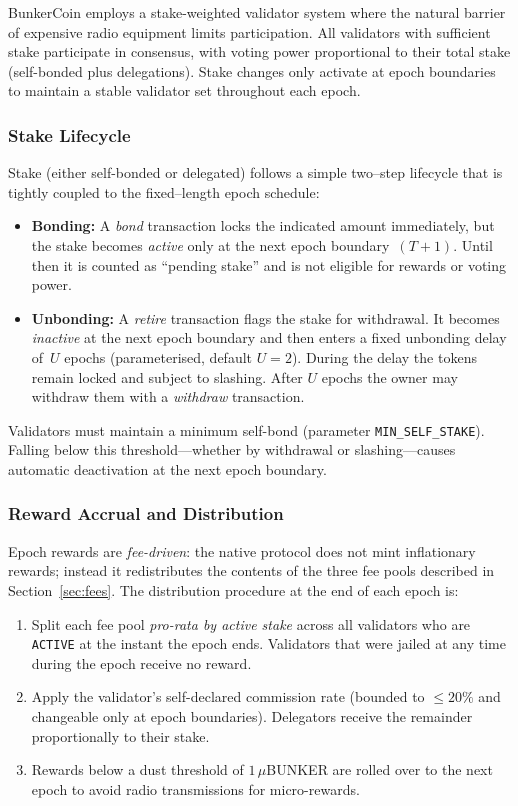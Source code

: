 \documentclass{article}
\begin{document}
BunkerCoin employs a stake-weighted validator system where the natural barrier of expensive radio equipment limits participation. All validators with sufficient stake participate in consensus, with voting power proportional to their total stake (self-bonded plus delegations). Stake changes only activate at epoch boundaries to maintain a stable validator set throughout each epoch.

\subsubsection{Stake Lifecycle} 
\label{sec:stake_lifecycle}

Stake (either self-bonded or delegated) follows a simple two–step lifecycle that is tightly coupled to the fixed–length epoch schedule:
\begin{itemize}
    \item \textbf{Bonding:} A {\em bond} transaction locks the indicated amount immediately, but the stake becomes \emph{active} only at the next epoch boundary~$(T+1)$.  Until then it is counted as ``pending stake'' and is not eligible for rewards or voting power.
    \item \textbf{Unbonding:} A {\em retire} transaction flags the stake for withdrawal.  It becomes \emph{inactive} at the next epoch boundary and then enters a fixed unbonding delay of~$U$ epochs (parameterised, default $U=2$).  During the delay the tokens remain locked and subject to slashing.  After $U$ epochs the owner may withdraw them with a {\em withdraw} transaction.
\end{itemize}

Validators must maintain a minimum self-bond (parameter \texttt{MIN\_SELF\_STAKE}).  Falling below this threshold—whether by withdrawal or slashing—causes automatic deactivation at the next epoch boundary.

\subsubsection{Reward Accrual and Distribution}
\label{sec:stake_rewards}

Epoch rewards are \emph{fee-driven}: the native protocol does not mint inflationary rewards; instead it redistributes the contents of the three fee pools described in Section~\ref{sec:fees}.  The distribution procedure at the end of each epoch is:

\begin{enumerate}
    \item Split each fee pool \emph{pro-rata by active stake} across all validators who are \texttt{ACTIVE} at the instant the epoch ends.  Validators that were jailed at any time during the epoch receive no reward.
    \item Apply the validator’s self-declared commission rate (bounded to $\le 20\%$ and changeable only at epoch boundaries).  Delegators receive the remainder proportionally to their stake.
    \item Rewards below a dust threshold of $1\,\mu$BUNKER are rolled over to the next epoch to avoid radio transmissions for micro-rewards.
\end{enumerate}
\end{document}
